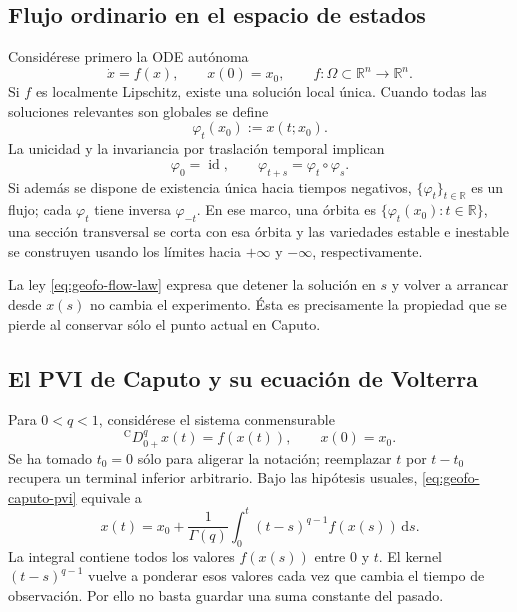 \subsection{Flujo ordinario en el espacio de estados}

Considérese primero la ODE autónoma
\begin{equation}
 \dot x=f(x),\qquad x(0)=x_0,\qquad f:\Omega\subset\mathbb R^n\to\mathbb R^n.
 \label{eq:geofo-ode}
\end{equation}
Si \(f\) es localmente Lipschitz, existe una solución local única. Cuando todas
las soluciones relevantes son globales se define
\begin{equation}
 \varphi_t(x_0):=x(t;x_0).
 \label{eq:geofo-ode-flow}
\end{equation}
La unicidad y la invariancia por traslación temporal implican
\begin{equation}
 \varphi_0=\operatorname{id},\qquad
 \varphi_{t+s}=\varphi_t\circ\varphi_s.
 \label{eq:geofo-flow-law}
\end{equation}
Si además se dispone de existencia única hacia tiempos negativos,
\(\{\varphi_t\}_{t\in\mathbb R}\) es un flujo; cada \(\varphi_t\) tiene inversa
\(\varphi_{-t}\). En ese marco, una órbita es
\(\{\varphi_t(x_0):t\in\mathbb R\}\), una sección transversal se corta con esa
órbita y las variedades estable e inestable se construyen usando los límites
hacia \(+\infty\) y \(-\infty\), respectivamente.

La ley \cref{eq:geofo-flow-law} expresa que detener la solución en \(s\) y
volver a arrancar desde \(x(s)\) no cambia el experimento. Ésta es precisamente
la propiedad que se pierde al conservar sólo el punto actual en Caputo.

\subsection{El PVI de Caputo y su ecuación de Volterra}

Para \(0<q<1\), considérese el sistema conmensurable
\begin{equation}
 {}^{\mathrm C}D_{0+}^{q}x(t)=f(x(t)),
 \qquad x(0)=x_0.
 \label{eq:geofo-caputo-pvi}
\end{equation}
Se ha tomado \(t_0=0\) sólo para aligerar la notación; reemplazar \(t\) por
\(t-t_0\) recupera un terminal inferior arbitrario. Bajo las hipótesis usuales,
\cref{eq:geofo-caputo-pvi} equivale a
\begin{equation}
 x(t)=x_0+\frac1{\Gamma(q)}
 \int_0^t(t-s)^{q-1}f(x(s))\,\mathrm ds.
 \label{eq:geofo-volterra}
\end{equation}
La integral contiene todos los valores \(f(x(s))\) entre \(0\) y \(t\). El
kernel \( (t-s)^{q-1}\) vuelve a ponderar esos valores cada vez que cambia el
tiempo de observación. Por ello no basta guardar una suma constante del pasado.

